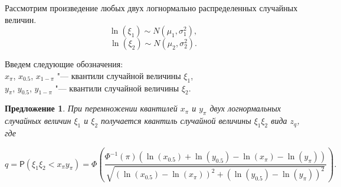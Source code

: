 \documentclass[12pt]{article}
\newtheorem{proposition}[theorem]{Предложение}
\begin{document}
	Рассмотрим произведение любых двух логнормально распределенных случайных величин.
	\begin{equation*}
		\ln(\xi_{1}) \sim N(\mu_{1}, \sigma _{1}^{2}),
	\end{equation*}
	\begin{equation*}
		\ln(\xi_{2}) \sim N(\mu_{2}, \sigma _{2}^{2}).
	\end{equation*}
	
	Введем следующие обозначения:\\
	$x_{\pi}$, $x_{0.5}$, $x_{1-\pi}$ "--- квантили случайной величины $\xi_{1}$,\\
	$y_{\pi}$, $y_{0.5}$, $y_{1-\pi}$ "--- квантили случайной величины $\xi_{2}$.
	
	\begin{proposition}
		При перемножении квантилей $x_{\pi}$ и $y_{\pi}$ двух логнормальных случайных величин $\xi_{1}$ и $\xi_{2}$ получается квантиль случайной величины $\xi_{1}\xi_{2}$ вида $z_{q}$, где
		
		\begin{equation}
			q = \mathsf{P}(\xi_{1}\xi_{2}< x_{\pi}y_{\pi}) =\Phi\left(\frac{\Phi^{-1}(\pi)(\ln(x_{0.5})+\ln(y_{0.5})-\ln(x_{\pi})-\ln(y_{\pi}))}{\sqrt{(\ln(x_{0.5})-\ln(x_{\pi}))^{2}+(\ln(y_{0.5})-\ln(y_{\pi}))^{2}}}\right).
		\end{equation} 
	\end{proposition}
\end{document}
